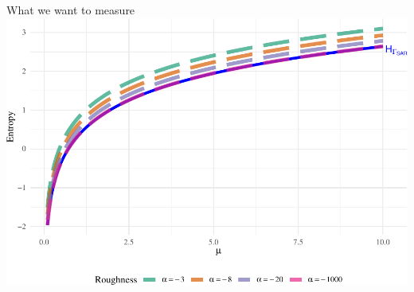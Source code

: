 \documentclass[table,aspectratio=169]{beamer}
\begin{document}
{
	\begin{frame}{What we want to measure}
		\centering
\includegraphics[width=0.78\linewidth]{R1-Identifying-Heterogeneity-in-SAR-Data-with-New-Test-Statistics_files/figure-latex/Plot_GI0_to_gamma1-1}
	\end{frame}
}
\end{document}

